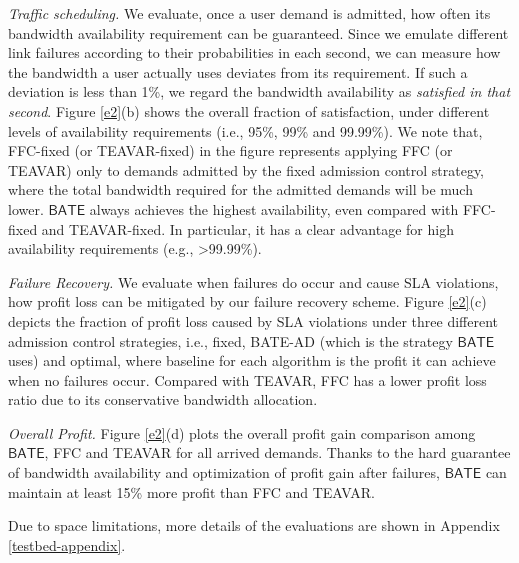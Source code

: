 \documentclass[sigconf]{acmart}
\begin{document}
\textit{Traffic scheduling.} We evaluate, once a user demand is admitted, 
how often its bandwidth availability requirement can be guaranteed. 
Since we emulate different link failures according to their probabilities in each second, 
we can measure how the bandwidth a user actually uses deviates from its requirement. 
If such a deviation is less than 1\%, we regard the bandwidth availability as \textit{satisfied in that second}. Figure \ref{e2}(b) shows the overall fraction of satisfaction, under  different levels of availability requirements (i.e., 95\%, 99\% and 99.99\%). 
We note that, FFC-fixed (or TEAVAR-fixed) in the figure represents applying FFC (or TEAVAR) 
only to demands admitted by the fixed admission control strategy, 
where the total bandwidth required for the admitted demands will be much lower. 
$\mathsf{BATE}$ always achieves the highest availability, even compared with FFC-fixed and TEAVAR-fixed. 
In particular, it has a clear advantage for high availability requirements (e.g., >99.99\%). 


\textit{Failure Recovery.} We evaluate when failures do occur and cause SLA violations, 
how profit loss can be mitigated by our failure recovery scheme.
Figure \ref{e2}(c) depicts the fraction of profit loss caused by SLA violations under three different admission control strategies, i.e., fixed, BATE-AD (which is the strategy $\mathsf{BATE}$ uses) and optimal, where baseline for each algorithm is the profit it can achieve when no failures occur. 
Compared with TEAVAR, FFC has a lower profit loss ratio due to its conservative bandwidth allocation. 



\textit{Overall Profit.}
Figure \ref{e2}(d) plots the overall profit gain comparison among $\mathsf{BATE}$, FFC and TEAVAR  for all arrived demands.
Thanks to the hard guarantee of bandwidth availability and optimization of profit gain after failures, $\mathsf{BATE}$ can maintain at least 15\% more profit than  FFC and TEAVAR.

Due to space limitations, more details of the evaluations are shown in  Appendix \ref{testbed-appendix}.
\end{document}

